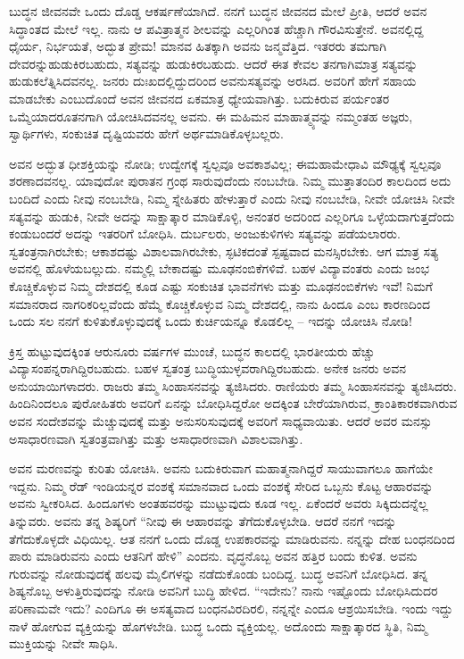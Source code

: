 ಬುದ್ಧನ ಜೀವನವೇ ಒಂದು ದೊಡ್ಡ ಆಕರ್ಷಣೆಯಾಗಿದೆ. ನನಗೆ ಬುದ್ಧನ ಜೀವನದ ಮೇಲೆ ಪ್ರೀತಿ, ಆದರೆ ಅವನ ಸಿದ್ಧಾಂತದ ಮೇಲೆ ಇಲ್ಲ. ನಾನು ಆ ಪವಿತ್ರಾತ್ಮನ ಶೀಲವನ್ನು ಎಲ್ಲರಿಗಿಂತ ಹೆಚ್ಚಾಗಿ ಗೌರವಿಸುತ್ತೇನೆ. ಅವನಲ್ಲಿದ್ದ ಧೈರ್ಯ, ನಿರ್ಭಯತೆ, ಅದ್ಭುತ ಪ್ರೇಮ! ಮಾನವ ಹಿತಕ್ಕಾಗಿ ಅವನು ಜನ್ಮವೆತ್ತಿದ. ಇತರರು ತಮಗಾಗಿ ದೇವರನ್ನು\break ಹುಡುಕಿರಬಹುದು, ಸತ್ಯವನ್ನು ಹುಡುಕಿರಬಹುದು. ಆದರೆ ಈತ ಕೇವಲ ತನಗಾಗಿ\break ಮಾತ್ರ ಸತ್ಯವನ್ನು ಹುಡುಕಲೆತ್ನಿಸಿದವನಲ್ಲ. ಜನರು ದುಃಖದಲ್ಲಿದ್ದುದರಿಂದ ಅವನು\break ಸತ್ಯವನ್ನು ಅರಸಿದ. ಅವರಿಗೆ ಹೇಗೆ ಸಹಾಯ ಮಾಡಬೇಕು ಎಂಬುದೊಂದೆ ಅವನ ಜೀವನದ ಏಕಮಾತ್ರ ಧ್ಯೇಯವಾಗಿತ್ತು. ಬದುಕಿರುವ ಪರ್ಯಂತರ ಒಮ್ಮೆಯಾದರೂ\break ತನಗಾಗಿ ಯೋಚಿಸಿದವನಲ್ಲ ಅವನು. ಈ ಮಹಿಮನ ಮಾಹಾತ್ಮ್ಯವನ್ನು ನಮ್ಮಂತಹ ಅಜ್ಞರು, ಸ್ವಾರ್ಥಿಗಳು, ಸಂಕುಚಿತ ದೃಷ್ಟಿಯವರು ಹೇಗೆ ಅರ್ಥಮಾಡಿಕೊಳ್ಳಬಲ್ಲರು.

ಅವನ ಅದ್ಭುತ ಧೀಶಕ್ತಿಯನ್ನು ನೋಡಿ; ಉದ್ವೇಗಕ್ಕೆ ಸ್ವಲ್ಪವೂ ಅವಕಾಶವಿಲ್ಲ; ಈ\break ಮಹಾಮೇಧಾವಿ ಮೌಢ್ಯಕ್ಕೆ ಸ್ವಲ್ಪವೂ ಶರಣಾದವನಲ್ಲ. ಯಾವುದೋ ಪುರಾತನ ಗ್ರಂಥ ಸಾರುವುದೆಂದು ನಂಬಬೇಡಿ. ನಿಮ್ಮ ಮುತ್ತಾತಂದಿರ ಕಾಲದಿಂದ ಅದು ಬಂದಿದೆ ಎಂದು ನೀವು ನಂಬಬೇಡಿ, ನಿಮ್ಮ ಸ್ನೇಹಿತರು ಹೇಳುತ್ತಾರೆ ಎಂದು ನೀವು ನಂಬಬೇಡಿ, ನೀವೇ ಯೋಚಿಸಿ ನೀವೇ ಸತ್ಯವನ್ನು ಹುಡುಕಿ, ನೀವೇ ಅದನ್ನು ಸಾಕ್ಷಾತ್ಕಾರ ಮಾಡಿಕೊಳ್ಳಿ, ಅನಂತರ ಅದರಿಂದ ಎಲ್ಲರಿಗೂ ಒಳ್ಳೆಯದಾಗುತ್ತದೆಂದು ಕಂಡುಬಂದರೆ ಅದನ್ನು ಇತರರಿಗೆ ಬೋಧಿಸಿ. ದುರ್ಬಲರು, ಅಂಜುಕುಳಿಗಳು ಸತ್ಯವನ್ನು ಪಡೆಯಲಾರರು. ಸ್ವತಂತ್ರನಾಗಿರಬೇಕು; ಆಕಾಶದಷ್ಟು ವಿಶಾಲವಾಗಿರಬೇಕು, ಸ್ಫಟಿಕದಂತೆ ಸ್ಪಷ್ಟವಾದ ಮನಸ್ಸಿರಬೇಕು. ಆಗ ಮಾತ್ರ ಸತ್ಯ ಅವನಲ್ಲಿ ಹೊಳೆಯಬಲ್ಲುದು. ನಮ್ಮಲ್ಲಿ ಬೇಕಾದಷ್ಟು ಮೂಢನಂಬಿಕೆಗಳಿವೆ. ಬಹಳ ವಿದ್ಯಾವಂತರು ಎಂದು ಜಂಭ ಕೊಚ್ಚಿಕೊಳ್ಳುವ ನಿಮ್ಮ ದೇಶದಲ್ಲಿ ಕೂಡ ಎಷ್ಟು ಸಂಕುಚಿತ ಭಾವನೆಗಳು ಮತ್ತು ಮೂಢನಂಬಿಕೆಗಳು ಇವೆ! ನಿಮಗೆ ಸಮಾನರಾದ ನಾಗರಿಕರಿಲ್ಲವೆಂದು ಹೆಮ್ಮೆ ಕೊಚ್ಚಿಕೊಳ್ಳುವ ನಿಮ್ಮ ದೇಶದಲ್ಲಿ, ನಾನು ಹಿಂದೂ ಎಂಬ ಕಾರಣದಿಂದ ಒಂದು ಸಲ ನನಗೆ ಕುಳಿತುಕೊಳ್ಳುವುದಕ್ಕೆ ಒಂದು ಕುರ್ಚಿಯನ್ನೂ ಕೊಡಲಿಲ್ಲ – ಇದನ್ನು ಯೋಚಿಸಿ ನೋಡಿ!

ಕ್ರಿಸ್ತ ಹುಟ್ಟುವುದಕ್ಕಿಂತ ಆರುನೂರು ವರ್ಷಗಳ ಮುಂಚೆ, ಬುದ್ಧನ ಕಾಲದಲ್ಲಿ ಭಾರ\-ತೀಯರು ಹೆಚ್ಚು ವಿದ್ಯಾಸಂಪನ್ನರಾಗಿದ್ದಿರಬಹುದು. ಬಹಳ ಸ್ವತಂತ್ರ ಬುದ್ಧಿಯುಳ್ಳವ\-ರಾಗಿದ್ದಿರಬಹುದು. ಅನೇಕ ಜನರು ಅವನ ಅನುಯಾಯಿಗಳಾದರು. ರಾಜರು ತಮ್ಮ ಸಿಂಹಾಸನವನ್ನು ತ್ಯಜಿಸಿದರು. ರಾಣಿಯರು ತಮ್ಮ ಸಿಂಹಾಸನವನ್ನು ತ್ಯಜಿಸಿದರು. ಹಿಂದಿನಿಂದಲೂ ಪುರೋಹಿತರು ಅವರಿಗೆ ಏನನ್ನು ಬೋಧಿಸಿದ್ದರೋ ಅದಕ್ಕಿಂತ ಬೇರೆಯಾಗಿರುವ, ಕ್ರಾಂತಿಕಾರಕವಾಗಿರುವ ಅವನ ಸಂದೇಶವನ್ನು ಮೆಚ್ಚುವುದಕ್ಕೆ ಮತ್ತು ಅನುಸರಿಸುವುದಕ್ಕೆ ಅವರಿಗೆ ಸಾಧ್ಯವಾಯಿತು. ಆದರೆ ಅವರ ಮನಸ್ಸು ಅಸಾಧಾರಣವಾಗಿ ಸ್ವತಂತ್ರವಾಗಿತ್ತು ಮತ್ತು ಅಸಾಧಾರಣವಾಗಿ ವಿಶಾಲವಾಗಿತ್ತು.

ಅವನ ಮರಣವನ್ನು ಕುರಿತು ಯೋಚಿಸಿ. ಅವನು ಬದುಕಿರುವಾಗ ಮಹಾತ್ಮನಾಗಿದ್ದರೆ ಸಾಯುವಾಗಲೂ ಹಾಗೆಯೇ ಇದ್ದನು. ನಿಮ್ಮ ರೆಡ್​ ಇಂಡಿಯನ್ನರ ವಂಶಕ್ಕೆ ಸಮಾನವಾದ ಒಂದು ವಂಶಕ್ಕೆ ಸೇರಿದ ಒಬ್ಬನು ಕೊಟ್ಟ ಆಹಾರವನ್ನು ಅವನು ಸ್ವೀಕರಿಸಿದ. ಹಿಂದೂಗಳು ಅಂತಹವರನ್ನು ಮುಟ್ಟುವುದು ಕೂಡ ಇಲ್ಲ. ಏಕೆಂದರೆ ಅವರು ಸಿಕ್ಕಿದುದನ್ನೆಲ್ಲ ತಿನ್ನುವರು. ಅವನು ತನ್ನ ಶಿಷ್ಯರಿಗೆ “ನೀವು ಈ ಆಹಾರವನ್ನು ತೆಗೆದುಕೊಳ್ಳಬೇಡಿ. ಆದರೆ ನನಗೆ ಇದನ್ನು ತೆಗೆದುಕೊಳ್ಳದೇ ವಿಧಿಯಿಲ್ಲ. ಆತ ನನಗೆ ಒಂದು ದೊಡ್ಡ ಉಪಕಾರವನ್ನು ಮಾಡಿರುವನು. ನನ್ನನ್ನು ದೇಹ ಬಂಧನದಿಂದ ಪಾರು ಮಾಡಿರುವನು ಎಂದು ಆತನಿಗೆ ಹೇಳಿ” ಎಂದನು. ವೃದ್ಧನೊಬ್ಬ ಅವನ ಹತ್ತಿರ ಬಂದು ಕುಳಿತ. ಅವನು ಗುರುವನ್ನು ನೋಡುವುದಕ್ಕೆ ಹಲವು ಮೈಲಿಗಳನ್ನು ನಡೆದುಕೊಂಡು ಬಂದಿದ್ದ. ಬುದ್ಧ ಅವನಿಗೆ ಬೋಧಿಸಿದ. ತನ್ನ ಶಿಷ್ಯನೊಬ್ಬ ಅಳುತ್ತಿರುವುದನ್ನು ನೋಡಿ ಅವನಿಗೆ ಬುದ್ಧಿ ಹೇಳಿದ. “ಇದೇನು? ನಾನು ಇಷ್ಟೊಂದು ಬೋಧಿಸಿದುದರ ಪರಿಣಾಮವೇ ಇದು? ಎಂದಿಗೂ ಈ ಅಸತ್ಯವಾದ ಬಂಧನವಿರದಿರಲಿ, ನನ್ನನ್ನೇ ಎಂದೂ ಆಶ್ರಯಿಸಬೇಡಿ. ಇಂದು ಇದ್ದು ನಾಳೆ ಹೋಗುವ ವ್ಯಕ್ತಿಯನ್ನು ಹೊಗಳಬೇಡಿ. ಬುದ್ಧ ಒಂದು ವ್ಯಕ್ತಿಯಲ್ಲ. ಅದೊಂದು ಸಾಕ್ಷಾತ್ಕಾರದ ಸ್ಥಿತಿ, ನಿಮ್ಮ ಮುಕ್ತಿಯನ್ನು ನೀವೇ ಸಾಧಿಸಿ.

